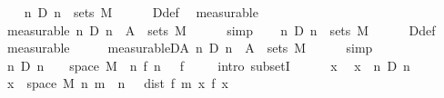 \begin{isabellebody}
\ \ \isamarkupfalse%
\ {\isachardoublequoteopen}{\isasymAnd}n{\isachardot}{\kern0pt}\ D\ n\ {\isasymin}\ sets\ M{\isachardoublequoteclose}\isanewline
\ \ \ \ \isamarkupfalse%
\ D{\isacharunderscore}{\kern0pt}def\ \isamarkupfalse%
\ measurable\isanewline
\ \ \isamarkupfalse%
\ \isamarkupfalse%
\ {\isacharbrackleft}{\kern0pt}measurable{\isacharbrackright}{\kern0pt}{\isacharcolon}{\kern0pt}\ {\isachardoublequoteopen}{\isasymAnd}n{\isachardot}{\kern0pt}\ D\ n\ {\isasyminter}\ A\ {\isasymin}\ sets\ M{\isachardoublequoteclose}\isanewline
\ \ \ \ \isamarkupfalse%
\ simp\isanewline
\ \ \isamarkupfalse%
\ {\isachardoublequoteopen}{\isacharparenleft}{\kern0pt}{\isasymInter}n{\isachardot}{\kern0pt}\ D\ n{\isacharparenright}{\kern0pt}\ {\isasymin}\ sets\ M{\isachardoublequoteclose}\isanewline
\ \ \ \ \isamarkupfalse%
\ D{\isacharunderscore}{\kern0pt}def\ \isamarkupfalse%
\ measurable\isanewline
\ \ \isamarkupfalse%
\ \isamarkupfalse%
\ measurable{\isacharunderscore}{\kern0pt}D{\isacharunderscore}{\kern0pt}A{\isacharcolon}{\kern0pt}\ {\isachardoublequoteopen}{\isacharparenleft}{\kern0pt}{\isasymInter}n{\isachardot}{\kern0pt}\ D\ n\ {\isasyminter}\ A{\isacharparenright}{\kern0pt}\ {\isasymin}\ sets\ M{\isachardoublequoteclose}\isanewline
\ \ \ \ \isamarkupfalse%
\ simp\isanewline
\ \ \isamarkupfalse%
\ {\isachardoublequoteopen}{\isacharparenleft}{\kern0pt}{\isasymInter}n{\isachardot}{\kern0pt}\ D\ n{\isacharparenright}{\kern0pt}\ {\isasymsubseteq}\ {\isacharbraceleft}{\kern0pt}{\isasymomega}\ {\isasymin}\ space\ M{\isachardot}{\kern0pt}\ {\isasymnot}\ {\isacharparenleft}{\kern0pt}{\isasymlambda}n{\isachardot}{\kern0pt}\ {\isacharparenleft}{\kern0pt}f{\isacharprime}{\kern0pt}\ n\ {\isasymomega}{\isacharparenright}{\kern0pt}{\isacharparenright}{\kern0pt}\ {\isasymlonglonglongrightarrow}\ f\ {\isasymomega}{\isacharbraceright}{\kern0pt}{\isachardoublequoteclose}\isanewline
\ \ \isamarkupfalse%
\ {\isacharparenleft}{\kern0pt}intro\ subsetI{\isacharparenright}{\kern0pt}\isanewline
\ \ \ \ \isamarkupfalse%
\ x\ \isamarkupfalse%
\ {\isachardoublequoteopen}x\ {\isasymin}\ {\isacharparenleft}{\kern0pt}{\isasymInter}n{\isachardot}{\kern0pt}\ D\ n{\isacharparenright}{\kern0pt}{\isachardoublequoteclose}\isanewline
\ \ \ \ \isamarkupfalse%
\ \isamarkupfalse%
\ {\isachardoublequoteopen}x\ {\isasymin}\ space\ M{\isachardoublequoteclose}\ {\isachardoublequoteopen}{\isasymAnd}n{\isachardot}{\kern0pt}\ {\isasymexists}m\ {\isasymge}\ n{\isachardot}{\kern0pt}\ {\isasymepsilon}\ {\isacharless}{\kern0pt}\ dist\ {\isacharparenleft}{\kern0pt}f{\isacharprime}{\kern0pt}\ m\ x{\isacharparenright}{\kern0pt}\ {\isacharparenleft}{\kern0pt}f\ x{\isacharparenright}{\kern0pt}{\isachardoublequoteclose}\isanewline

\end{isabellebody}
